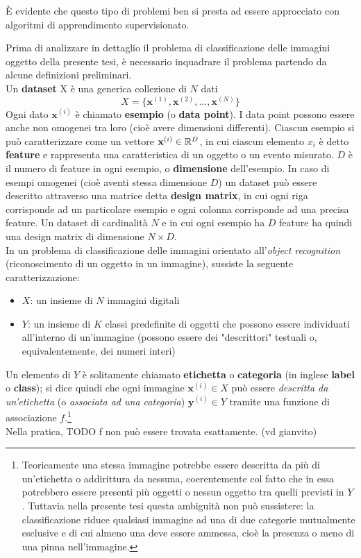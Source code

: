 È evidente che questo tipo di problemi ben si presta ad essere approcciato con algoritmi di apprendimento supervisionato.

Prima di analizzare in dettaglio il problema di classificazione delle immagini oggetto della presente tesi, è necessario inquadrare il problema partendo da alcune definizioni preliminari.\\

Un \textbf{dataset} X è una generica collezione di $N$ dati
\[X=\{\mathbf{x}^{(1)},\mathbf{x}^{(2)},\dots,\mathbf{x}^{(N)}\}\]
Ogni dato $\mathbf{x}^{(i)}$ è chiamato \textbf{esempio} (o \textbf{data point}).
I data point possono essere anche non omogenei tra loro (cioè avere dimensioni differenti).
Ciascun esempio si può caratterizzare come un vettore $\mathbf{x}^{(i)}\in\mathbb{R}^{D}$, in cui ciascun elemento $x_i$ è detto \textbf{feature} e rappresenta una caratteristica di un oggetto o un evento misurato. $D$ è il numero di feature in ogni esempio, o \textbf{dimensione} dell'esempio.
In caso di esempi omogenei (cioè aventi stessa dimensione $D$) un dataset può essere descritto attraverso una matrice detta \textbf{design matrix}, in cui ogni riga corrisponde ad un particolare esempio e ogni colonna corrisponde ad una precisa feature.
Un dataset di cardinalità $N$ e in cui ogni esempio ha $D$ feature ha quindi una design matrix di dimensione $N\times D$. \\

In un problema di classificazione delle immagini orientato all'\textit{object recognition} (riconoscimento di un oggetto in un immagine), sussiste la seguente caratterizzazione:
\begin{itemize}
\item $X$: un insieme di $N$ immagini digitali
\item $Y$: un insieme di $K$ classi predefinite di oggetti che possono essere individuati all'interno di un'immagine (possono essere dei "descrittori" testuali o, equivalentemente, dei numeri interi)
\end{itemize}
Un elemento di $Y$ è solitamente chiamato \textbf{etichetta} o \textbf{categoria} (in inglese \textbf{label} o \textbf{class}); si dice quindi che ogni immagine $\mathbf{x}^{(i)}\in X$ può essere \textit{descritta da un'etichetta} (o \textit{associata ad una categoria}) $\mathbf{y}^{(i)}\in Y$ tramite una funzione di associazione $f$.\footnote{Teoricamente una stessa immagine potrebbe essere descritta da più di un'etichetta o addirittura da nessuna, coerentemente col fatto che in essa potrebbero essere presenti più oggetti o nessun oggetto tra quelli previsti in $Y$. Tuttavia nella presente tesi questa ambiguità non può sussistere: la classificazione riduce qualsiasi immagine ad una di due categorie mutualmente esclusive e di cui almeno una deve essere ammessa, cioè la presenza o meno di una pinna nell'immagine.}\\
Nella pratica, TODO f non può essere trovata esattamente. (vd gianvito)

